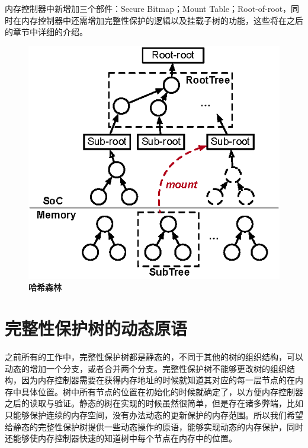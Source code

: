 内存控制器中新增加三个部件：Secure Bitmap；Mount Table；Root-of-root，同时在内存控制器中还需增加完整性保护的逻辑以及挂载子树的功能，这些将在之后的章节中详细的介绍。

\begin{figure}[!htp]
    \centering
    \includegraphics[scale=1]{fig/design-hw-mountable-tree.eps}
    \caption{\textbf{哈希森林}}
    \label{fig:hash-forest}
  \end{figure}
\section{完整性保护树的动态原语}
之前所有的工作中，完整性保护树都是静态的，不同于其他的树的组织结构，可以动态的增加一个分支，或者合并两个分支。完整性保护树不能够更改树的组织结构，因为内存控制器需要在获得内存地址的时候就知道其对应的每一层节点的在内存中具体位置。树中所有节点的位置在初始化的时候就确定了，以方便内存控制器之后的读取与验证。静态的树在实现的时候虽然很简单，但是存在诸多弊端，比如只能够保护连续的内存空间，没有办法动态的更新保护的内存范围。所以我们希望给静态的完整性保护树提供一些动态操作的原语，能够实现动态的内存保护，同时还能够使内存控制器快速的知道树中每个节点在内存中的位置。

